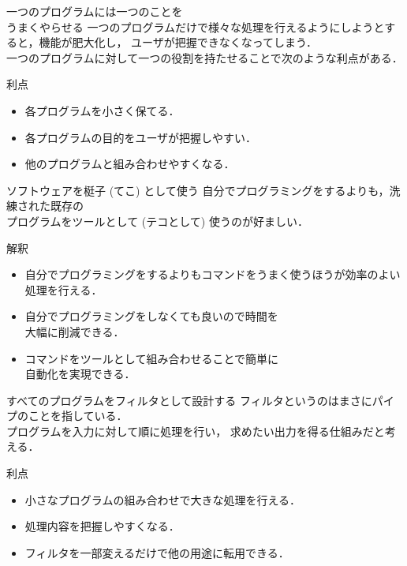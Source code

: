 \documentclass[uplatex, dvipdfmx, 12pt]{beamer}
\begin{document}
\begin{frame}{一つのプログラムには一つのことを\\うまくやらせる}
  一つのプログラムだけで様々な処理を行えるようにしようとすると，機能が肥大化し，
  ユーザが把握できなくなってしまう．\\
  一つのプログラムに対して一つの役割を持たせることで次のような利点がある．

  \begin{block}{利点}
  \begin{itemize}
    \item 各プログラムを小さく保てる．
    \item 各プログラムの目的をユーザが把握しやすい．
    \item 他のプログラムと組み合わせやすくなる． 
  \end{itemize}
  \end{block}

\end{frame}
\begin{frame}{ソフトウェアを梃子 (てこ) として使う}
  自分でプログラミングをするよりも，洗練された既存の\\
  プログラムをツールとして (テコとして) 使うのが好ましい．

  \begin{block}{解釈}
  \begin{itemize}
    \item 自分でプログラミングをするよりもコマンドをうまく使うほうが効率のよい処理を行える．
    \item 自分でプログラミングをしなくても良いので時間を\\大幅に削減できる．
    \item コマンドをツールとして組み合わせることで簡単に\\自動化を実現できる．
  \end{itemize}
  \end{block}
\end{frame}
\begin{frame}{すべてのプログラムをフィルタとして設計する}
  フィルタというのはまさにパイプのことを指している．\\
  プログラムを入力に対して順に処理を行い，
  求めたい出力を得る仕組みだと考える．

  \begin{block}{利点}
    \begin{itemize}
      \item 小さなプログラムの組み合わせで大きな処理を行える．
      \item 処理内容を把握しやすくなる．
      \item フィルタを一部変えるだけで他の用途に転用できる．
    \end{itemize}
  \end{block}
\end{frame}
\end{document}
